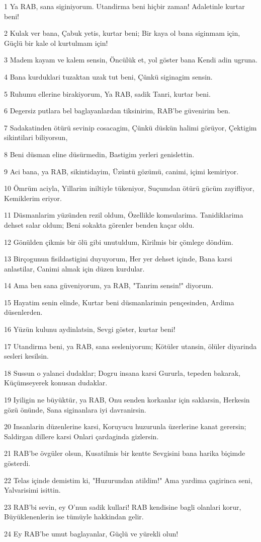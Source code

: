 \par 1 Ya RAB, sana siginiyorum. Utandirma beni hiçbir zaman! Adaletinle kurtar beni!
\par 2 Kulak ver bana, Çabuk yetis, kurtar beni; Bir kaya ol bana siginmam için, Güçlü bir kale ol kurtulmam için!
\par 3 Madem kayam ve kalem sensin, Öncülük et, yol göster bana Kendi adin ugruna.
\par 4 Bana kurduklari tuzaktan uzak tut beni, Çünkü siginagim sensin.
\par 5 Ruhumu ellerine birakiyorum, Ya RAB, sadik Tanri, kurtar beni.
\par 6 Degersiz putlara bel baglayanlardan tiksinirim, RAB'be güvenirim ben.
\par 7 Sadakatinden ötürü sevinip cosacagim, Çünkü düskün halimi görüyor, Çektigim sikintilari biliyorsun,
\par 8 Beni düsman eline düsürmedin, Bastigim yerleri genislettin.
\par 9 Aci bana, ya RAB, sikintidayim, Üzüntü gözümü, canimi, içimi kemiriyor.
\par 10 Ömrüm aciyla, Yillarim iniltiyle tükeniyor, Suçumdan ötürü gücüm zayifliyor, Kemiklerim eriyor.
\par 11 Düsmanlarim yüzünden rezil oldum, Özellikle komsularima. Tanidiklarima dehset salar oldum; Beni sokakta görenler benden kaçar oldu.
\par 12 Gönülden çikmis bir ölü gibi unutuldum, Kirilmis bir çömlege döndüm.
\par 13 Birçogunun fisildastigini duyuyorum, Her yer dehset içinde, Bana karsi anlastilar, Canimi almak için düzen kurdular.
\par 14 Ama ben sana güveniyorum, ya RAB, "Tanrim sensin!" diyorum.
\par 15 Hayatim senin elinde, Kurtar beni düsmanlarimin pençesinden, Ardima düsenlerden.
\par 16 Yüzün kulunu aydinlatsin, Sevgi göster, kurtar beni!
\par 17 Utandirma beni, ya RAB, sana sesleniyorum; Kötüler utansin, ölüler diyarinda sesleri kesilsin.
\par 18 Sussun o yalanci dudaklar; Dogru insana karsi Gururla, tepeden bakarak, Küçümseyerek konusan dudaklar.
\par 19 Iyiligin ne büyüktür, ya RAB, Onu senden korkanlar için saklarsin, Herkesin gözü önünde, Sana siginanlara iyi davranirsin.
\par 20 Insanlarin düzenlerine karsi, Koruyucu huzurunla üzerlerine kanat gerersin; Saldirgan dillere karsi Onlari çardaginda gizlersin.
\par 21 RAB'be övgüler olsun, Kusatilmis bir kentte Sevgisini bana harika biçimde gösterdi.
\par 22 Telas içinde demistim ki, "Huzurundan atildim!" Ama yardima çagirinca seni, Yalvarisimi isittin.
\par 23 RAB'bi sevin, ey O'nun sadik kullari! RAB kendisine bagli olanlari korur, Büyüklenenlerin ise tümüyle hakkindan gelir.
\par 24 Ey RAB'be umut baglayanlar, Güçlü ve yürekli olun!

